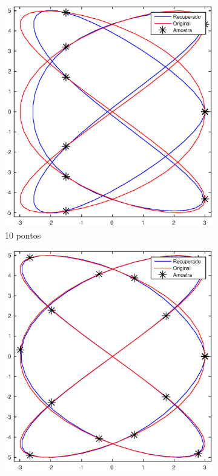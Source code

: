 \begin{figure}[htb]
\begin{subfigure}[b]{0.43\textwidth}
		\includegraphics[width=\textwidth]{imagens/cap4/rep_2_10.eps}
		\caption{10 pontos}
		\label{fig:ex24}
	\end{subfigure}
	\hfill
	\begin{subfigure}[b]{0.43\textwidth}
		\centering
		\includegraphics[width=\textwidth]{imagens/cap4/rep_2_15.eps}

\end{subfigure}
\end{figure}
